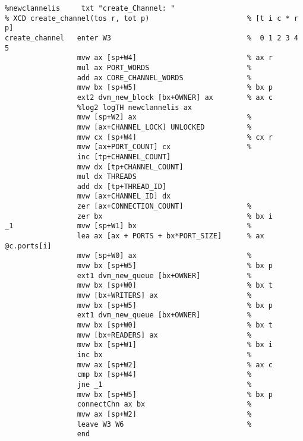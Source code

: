 {\small
\begin{verbatim}
%newclannelis     txt "create_Channel: "
% XCD create_channel(tos r, tot p)                       % [t i c * r p]
create_channel   enter W3                                %  0 1 2 3 4 5
                 mvw ax [sp+W4]                          % ax r
                 mul ax PORT_WORDS                       %
                 add ax CORE_CHANNEL_WORDS               %
                 mvw bx [sp+W5]                          % bx p
                 ext2 dvm_new_block [bx+OWNER] ax        % ax c
                 %log2 logTH newclannelis ax
                 mvw [sp+W2] ax                          %
                 mvw [ax+CHANNEL_LOCK] UNLOCKED          %
                 mvw cx [sp+W4]                          % cx r
                 mvw [ax+PORT_COUNT] cx                  %
                 inc [tp+CHANNEL_COUNT]
                 mvw dx [tp+CHANNEL_COUNT]
                 mul dx THREADS
                 add dx [tp+THREAD_ID]
                 mvw [ax+CHANNEL_ID] dx
                 zer [ax+CONNECTION_COUNT]               %
                 zer bx                                  % bx i
_1               mvw [sp+W1] bx                          %
                 lea ax [ax + PORTS + bx*PORT_SIZE]      % ax @c.ports[i]
                 mvw [sp+W0] ax                          %
                 mvw bx [sp+W5]                          % bx p
                 ext1 dvm_new_queue [bx+OWNER]           %
                 mvw bx [sp+W0]                          % bx t
                 mvw [bx+WRITERS] ax                     %
                 mvw bx [sp+W5]                          % bx p
                 ext1 dvm_new_queue [bx+OWNER]           %
                 mvw bx [sp+W0]                          % bx t
                 mvw [bx+READERS] ax                     %
                 mvw bx [sp+W1]                          % bx i
                 inc bx                                  %
                 mvw ax [sp+W2]                          % ax c
                 cmp bx [sp+W4]                          %
                 jne _1                                  %
                 mvw bx [sp+W5]                          % bx p
                 connectChn ax bx                        %
                 mvw ax [sp+W2]                          %
                 leave W3 W6                             %
                 end
\end{verbatim}}

\begin{tabbing}
\indents
{}
\fin
\end{tabbing}

